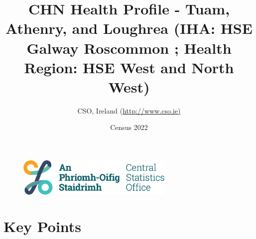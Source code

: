 \documentclass{article}
\title{CHN Health Profile - Tuam, Athenry, and Loughrea (IHA: HSE Galway Roscommon ;  Health Region: HSE West and North West) }
\date{Census 2022}
\author{CSO, Ireland  (\url{http://www.cso.ie)}}
\begin{document}


\begin{figure}
	\centering
\includegraphics[width =75mm]{../figures/CSO_Logo.png}
\end{figure}

				 
		   
						  
														  
																																													
												 
			 
\maketitle
					
													   
				 
						 
																																																																											   
				 
				  
  \pagebreak
    	    \tableofcontents

\pagebreak


\section{Key Points}
\end{document}
